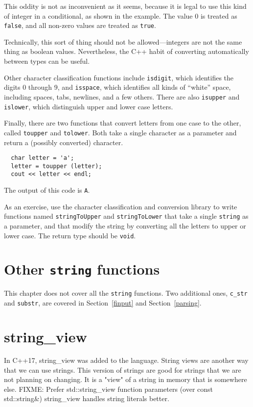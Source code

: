 This oddity is not as inconvenient as it seems, because it is
legal to use this kind of integer in a conditional, as shown
in the example.  The value 0 is treated as {\tt false}, and
all non-zero values are treated as {\tt true}.

Technically, this sort of thing should not be allowed---integers are
not the same thing as boolean values.  Nevertheless, the C++ habit of
converting automatically between types can be useful.

Other character classification functions include {\tt isdigit}, which
identifies the digits 0 through 9, and {\tt isspace}, which identifies
all kinds of ``white'' space, including spaces, tabs, newlines, and a
few others.  There are also {\tt isupper} and {\tt islower}, which
distinguish upper and lower case letters.

Finally, there are two functions that convert letters from one
case to the other, called {\tt toupper} and {\tt tolower}.  Both take
a single character as a parameter and return a (possibly
converted) character.

\begin{verbatim}
  char letter = 'a';
  letter = toupper (letter);
  cout << letter << endl;
\end{verbatim}
%
The output of this code is {\tt A}.

As an exercise, use the character classification and conversion
library to write functions named {\tt stringToUpper} and
{\tt stringToLower} that take a single {\tt string} as
a parameter, and that modify the string by converting all the
letters to upper or lower case.  The return type should be
{\tt void}.

\section{Other {\tt string} functions}

This chapter does not cover all the {\tt string} functions.
Two additional ones, {\tt c\_str} and {\tt substr}, are covered
in Section~\ref{finput} and Section~\ref{parsing}.

\section{string\_view}
In C++17, string\_view was added to the language. String
views are another way that we can use strings. This version
of strings are good for strings that we are not planning on
changing. It is a "view" of a string in memory that is
somewhere else.
FIXME: Prefer std::string\_view function parameters (over const std::string\&)
string\_view handles string literals better.

